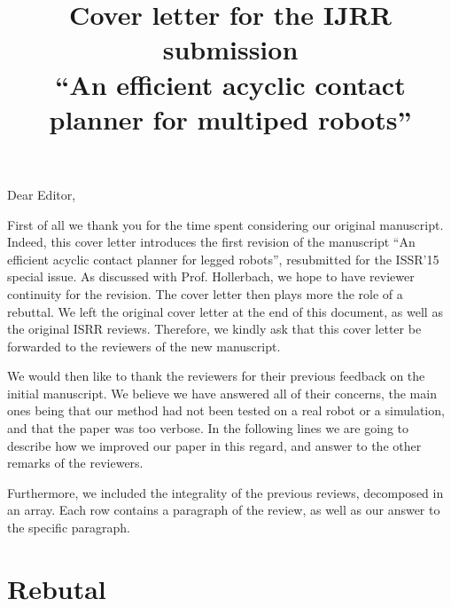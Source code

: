 \documentclass[a4paper]{article}
\author {}
\title {Cover letter for the IJRR submission \\ ``An efficient acyclic contact planner for multiped robots''}
\date {}
\begin{document}
\maketitle

Dear Editor, \medskip

First of all we thank you for the time spent considering our original manuscript. Indeed,
this cover letter introduces the first revision of the manuscript ``An efficient acyclic contact planner for legged robots'', resubmitted for the ISSR'15 special issue.
As discussed with Prof. Hollerbach, we hope to have reviewer continuity for the revision.
The cover letter then plays more the role of a rebuttal. We left the original cover letter at the end of this document, as well as the original ISRR reviews.
Therefore, we kindly ask that this cover letter be forwarded to the reviewers of the new manuscript.

We would then like to thank the reviewers for their previous feedback on the initial manuscript. We believe we have answered
all of their concerns, the main ones being that our method had not been tested on a real robot or a simulation, and that the paper was too verbose.
In the following lines we are going to describe how we improved our paper in this regard, and answer to the other remarks of the reviewers.

Furthermore, we included the integrality of the previous reviews, decomposed in an array. Each row contains a paragraph of the review, as well as our answer to the
specific paragraph.

\section{Rebutal}
\end{document}
